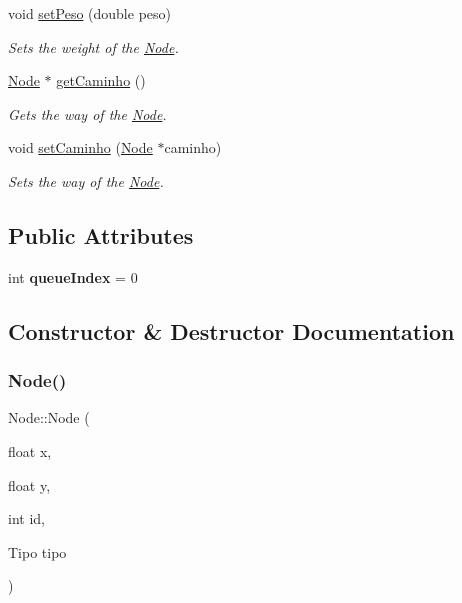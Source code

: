 \begin{DoxyCompactItemize}
\mbox{\label{class_node_a8b87f38557da58da35446bdda4e80f32}} 
void \mbox{\hyperlink{class_node_a8b87f38557da58da35446bdda4e80f32}{set\+Peso}} (double peso)
\begin{DoxyCompactList}\small\item\em Sets the weight of the \mbox{\hyperlink{class_node}{Node}}. \end{DoxyCompactList}\item 
\mbox{\hyperlink{class_node}{Node}} $\ast$ \mbox{\hyperlink{class_node_abf3a15fdc951747ca71f6c5da782dffc}{get\+Caminho}} ()
\begin{DoxyCompactList}\small\item\em Gets the way of the \mbox{\hyperlink{class_node}{Node}}. \end{DoxyCompactList}\item 
\mbox{\label{class_node_ac2774d12b10c4c967774a37fe5bc3c21}} 
void \mbox{\hyperlink{class_node_ac2774d12b10c4c967774a37fe5bc3c21}{set\+Caminho}} (\mbox{\hyperlink{class_node}{Node}} $\ast$caminho)
\begin{DoxyCompactList}\small\item\em Sets the way of the \mbox{\hyperlink{class_node}{Node}}. \end{DoxyCompactList}\end{DoxyCompactItemize}
\subsection*{Public Attributes}
\begin{DoxyCompactItemize}
\item 
\mbox{\label{class_node_a01788c18aef94f986ec563e8233365c1}} 
int {\bfseries queue\+Index} = 0
\end{DoxyCompactItemize}


\subsection{Constructor \& Destructor Documentation}
\mbox{\label{class_node_aaa40669ceede2bdca5ed19df3ef0eb65}} 
\subsubsection{\texorpdfstring{Node()}{Node()}}
{\footnotesize\ttfamily Node\+::\+Node (\begin{DoxyParamCaption}\item[{float}]{x,  }\item[{float}]{y,  }\item[{int}]{id,  }\item[{Tipo}]{tipo }\end{DoxyParamCaption})}



